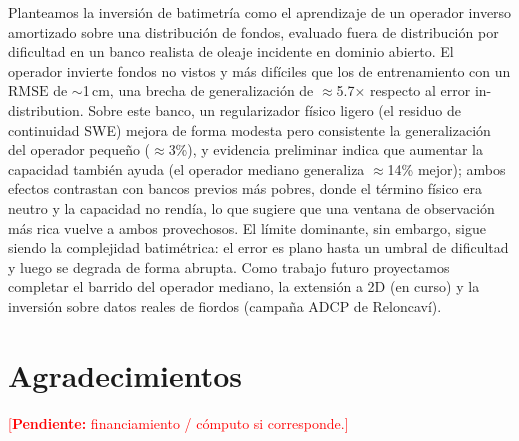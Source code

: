 \documentclass[conference]{IEEEtran}
\newcommand{\RMSE}{\mathrm{RMSE}}
\newcommand{\TODO}[1]{\textcolor{red}{[\textbf{Pendiente:} #1]}}
\begin{document}
Planteamos la inversión de batimetría como el aprendizaje de un operador inverso
amortizado sobre una distribución de fondos, evaluado fuera de distribución por
dificultad en un banco realista de oleaje incidente en dominio abierto. El
operador invierte fondos no vistos y más difíciles que los de entrenamiento con
un $\RMSE$ de $\sim$1\,cm, una brecha de generalización de $\approx$5.7$\times$
respecto al error in-distribution. Sobre este banco, un regularizador físico
ligero (el residuo de continuidad SWE) mejora de forma modesta pero consistente
la generalización del operador pequeño ($\approx$3\%), y evidencia preliminar
indica que aumentar la capacidad también ayuda (el operador mediano generaliza
$\approx$14\% mejor); ambos efectos contrastan con bancos previos más pobres,
donde el término físico era neutro y la capacidad no rendía, lo que sugiere que
una ventana de observación más rica vuelve a ambos provechosos. El límite
dominante, sin embargo, sigue siendo la complejidad batimétrica: el error es
plano hasta un umbral de dificultad y luego se degrada de forma abrupta. Como
trabajo futuro proyectamos completar el barrido del operador mediano, la
extensión a 2D (en curso) y la inversión sobre datos reales de fiordos (campaña
ADCP de Reloncaví).

\section*{Agradecimientos}
\TODO{financiamiento / cómputo si corresponde.}



\end{document}

